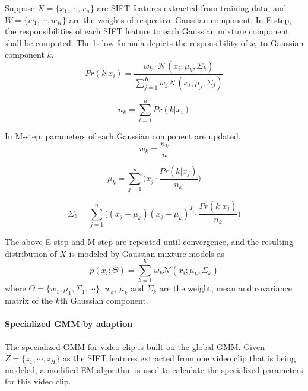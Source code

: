 	\noindent Suppose $X = \{x_1, \cdots, x_n\}$ are SIFT features extracted from training data, and $W = \{w_1, \cdots, w_K\}$ are the weights of respective Gaussian component. In E-step, the responsibilities of each SIFT feature to each Gaussian mixture component shall be computed. The below formula depicts the responsibility of $x_i$ to Gaussian component $k$.
	\begin{equation}
	Pr(k|x_i) = \frac{w_k \cdot \mathcal{N} (x_i ; \mu_k, \Sigma_k) }{\sum_{j=1}^{K}w_j \mathcal{N}(x_i ; \mu_j, \Sigma_j)}
	\end{equation}   

	\begin{equation}
	n_k = \sum_{i=1}^{n} Pr(k|x_i)
	\end{equation}

	\noindent In M-step, parameters of each Gaussian component are updated.
	\begin{equation}
	w_k = \frac{n_k}{n}
	\end{equation}

	\begin{equation}
	\mu_k = \sum_{j=1}^{n} \big( x_j \cdot \frac{Pr(k|x_j)}{n_k} \big)
	\end{equation}

	\begin{equation}
	\Sigma_k = \sum_{j=1}^{n} \big(  (x_j - \mu_k)(x_j - \mu_k)^T \cdot \frac{Pr(k|x_j)}{n_k} \big)
	\end{equation}

	\noindent The above E-step and M-step are repeated until convergence, and the resulting distribution of $X$ is modeled by Gaussian mixture models as 
	\begin{equation}
	p(x_i; \Theta) = \sum_{k=1}^{K} w_k \mathcal{N}(x_i; \mu_k, \Sigma_k)
	\end{equation}
	where $\Theta = \{w_1, \mu_1, \Sigma_1, \cdots \}$, $w_k$, $\mu_k$ and $\Sigma_k$ are the weight, mean and covariance matrix of the $k$th Gaussian component. 

	\paragraph{Specialized GMM by adaption}
	The specialized GMM for video clip is built on the global GMM. Given $Z = \{z_1,\cdots,z_H\}$ as the SIFT features extracted from one video clip that is being modeled, a modified EM algorithm is used to calculate the specialized parameters for this video clip. \\

